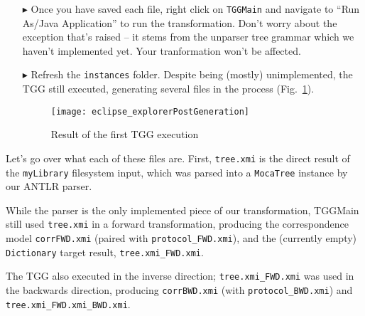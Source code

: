 \begin{itemize} 

\item[$\blacktriangleright$] Once you have saved each file, right click on \texttt{TGGMain} and navigate to ``Run As/Java Application'' to run the
transformation. Don't worry about the exception that's raised -- it stems from the unparser tree grammar which we haven't implemented yet. Your tranformation
won't be affected.

\item[$\blacktriangleright$] Refresh the \texttt{instances} folder. Despite being (mostly) unimplemented, the TGG still executed, generating several files in
the process (Fig.~\ref{eclipse:postParse}).

\vspace{0.5cm}

\begin{figure}[!htbp]
\begin{center}
 \texttt{[image: eclipse\_explorerPostGeneration]}
  \caption{Result of the first TGG execution}
  \label{eclipse:postParse}
\end{center}
\end{figure} 

\end{itemize}

Let's go over what each of these files are. First, \texttt{tree.xmi} is the direct result of the \texttt{my\-Lib\-rary} filesystem input, which was parsed into
a \texttt{MocaTree} instance by our ANTLR parser. 

While the parser is the only implemented piece of our transformation, TGGMain still used \texttt{tree.xmi} in a forward transformation, producing
the correspondence model \texttt{corrFWD.xmi} (paired with \texttt{protocol\_FWD.xmi}), and the (currently empty) \texttt{Dictionary} target result,
\texttt{tree.xmi\_FWD.xmi}.

\clearpage

The TGG also executed in the inverse direction; \texttt{tree.xmi\_FWD.xmi} was used in the backwards direction, producing \texttt{corrBWD.xmi} (with
\texttt{proto\-col\-\_BWD\-.xmi}) and \texttt{tree.xmi\_FWD.xmi\_BWD.xmi}. 


